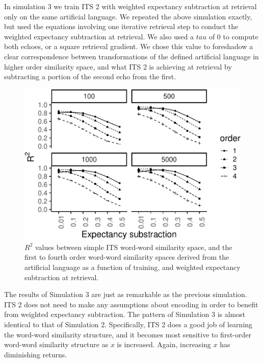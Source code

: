 \documentclass[
  jou]{apa6}
\begin{document}
In simulation 3 we train ITS 2 with weighted expectancy subtraction at retrieval only on the same artificial language. We repeated the above simulation exactly, but used the equations involving one iterative retrieval step to conduct the weighted expectancy subtraction at retrieval. We also used a \(tau\) of 0 to compute both echoes, or a square retrieval gradient. We chose this value to foreshadow a clear correspondence between transformations of the defined artificial language in higher order similarity space, and what ITS 2 is achieving at retrieval by subtracting a portion of the second echo from the first.

\begin{figure}
\centering
\includegraphics{ITS_cogsci_files/figure-latex/ITSretrieval-1.pdf}
\caption{\label{fig:ITSretrieval}\(R^2\) values between simple ITS word-word similarity space, and the first to fourth order word-word similarity spaces derived from the artificial language as a function of training, and weighted expectancy subtraction at retrieval.}
\end{figure}

The results of Simulation 3 are just as remarkable as the previous simulation. ITS 2 does not need to make any assumptions about encoding in order to benefit from weighted expectancy subtraction. The pattern of Simulation 3 is almost identical to that of Simulation 2. Specifically, ITS 2 does a good job of learning the word-word similarity structure, and it becomes most sensitive to first-order word-word similarity structure as \(x\) is increased. Again, increasing \(x\) has diminishing returns.
\end{document}
